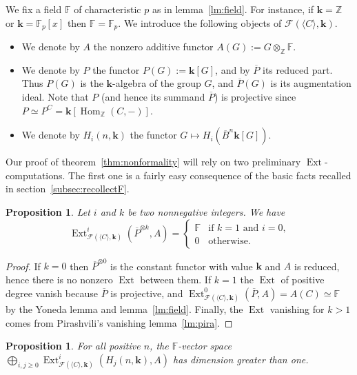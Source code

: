 \documentclass{amsart}
\newtheorem{proposition}[formula]{Proposition}
\theoremstyle{definition}
\theoremstyle{remark}
\newcommand{\Z}{\mathbb Z}
\newcommand{\F}{\mathbb F}
\DeclareMathOperator{\Hm}{Hom}
\DeclareMathOperator{\Ext}{Ext}
\renewcommand{\ge}{\geqslant}
\def\k{\mathbf{k}}
\begin{document}
We fix a field $\F$ of characteristic $p$ as in lemma~\ref{lm:field}. 
For instance, if $\k=\Z$ or $\k=\F_{p}[x]$ then $\F=\F_{p}$.
We introduce the following objects of $\mathcal{F}(\langle C\rangle,\k)$. 
\begin{itemize}
	\item We denote by $A$ the nonzero additive functor $A(G):=G\otimes_{\Z}\F$.
	\item We denote by $P$ the functor $P(G):=\k[G]$, and by $\overline{P}$ its reduced part. Thus $P(G)$ is the $\k$-algebra of the group $G$, and $\overline{P}(G)$ is its augmentation ideal. Note that $P$ (and hence its summand $\overline{P}$) is projective since $P\simeq P^{C}=\k[\Hm_{\Z}(C,-)]$. 
	\item We denote by $H_i(n,\k)$ the functor $G\mapsto H_i(\overline{B}^n\k[G])$.
\end{itemize}
Our proof of theorem~\ref{thm:nonformality} will rely on two preliminary $\Ext$-computations. The first one is a fairly easy consequence of the basic facts recalled in section~\ref{subsec:recollectF}.
\begin{proposition}\label{prop:Extcomputation1}
	Let $i$ and $k$ be two nonnegative integers. We have 
	\[
		\Ext^i_{\mathcal{F}(\langle C\rangle,\k)}(\overline{P}^{\otimes k},A)=
		\begin{cases}
			\F & \text{if $k=1$ and $i=0$,}\\
			0  & \text{otherwise.}
		\end{cases}
	\]
\end{proposition}
\begin{proof}
	If $k=0$ then $\overline{P}^{\otimes 0}$ is the constant functor with value $\k$ and $A$ is reduced, hence there is no nonzero $\Ext$ between them.
	If $k=1$ the $\Ext$ of positive degree vanish because $\overline{P}$ is projective, and $\Ext^0_{\mathcal{F}(\langle C\rangle,\k)}(\overline{P},A)=A(C)\simeq \F$ by the Yoneda lemma and lemma~\ref{lm:field}. Finally, the $\Ext$ vanishing for $k>1$ comes from Pirashvili's vanishing lemma~\ref{lm:pira}. 
\end{proof}

\begin{proposition}\label{prop:Extcomputation2}
	For all positive $n$, the $\F$-vector space $\bigoplus_{i,j\ge 0}\Ext^i_{\mathcal{F}(\langle C\rangle,\k)}(H_j(n,\k),A)$ has dimension greater than one.
\end{proposition}
\end{document}
